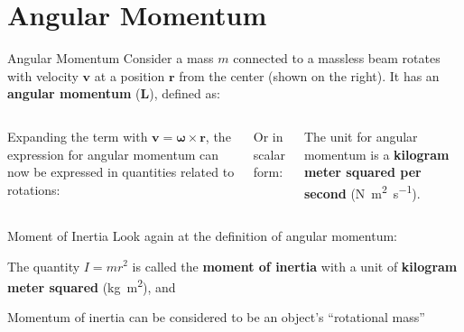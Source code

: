 \documentclass[12pt,compress,aspectratio=169]{beamer}
\begin{document}
\section{Angular Momentum}

\begin{frame}{Angular Momentum}
  Consider a mass $m$ connected to a massless beam rotates with velocity
  $\bm{v}$ at a position $\bm{r}$ from the center (shown on the right). It has
  an \textbf{angular momentum} ($\bm{L}$), defined as:
  \begin{columns}
    

    \vspace{-.1in}Expanding the term with $\bm{v}=\bm\omega\times\bm{r}$, the
    expression for angular momentum can now be expressed in quantities related
    to rotations:

    
    \vspace{-.2in}Or in scalar form:
    

    \vspace{-.2in}The unit for angular momentum is a
    \textbf{kilogram meter squared per second}
    (\si{\newton\metre\squared\per\second}).
    
  \end{columns}
\end{frame}



\begin{frame}{Moment of Inertia}
  Look again at the definition of angular momentum:
    
    
  The quantity $I=mr^2$ is called the \textbf{moment of inertia} with a unit of
  \textbf{kilogram meter squared} (\si{\kilo\gram\metre\squared}), and 


  Momentum of inertia can be considered to be an object's ``rotational mass''

\end{frame}
\end{document}
